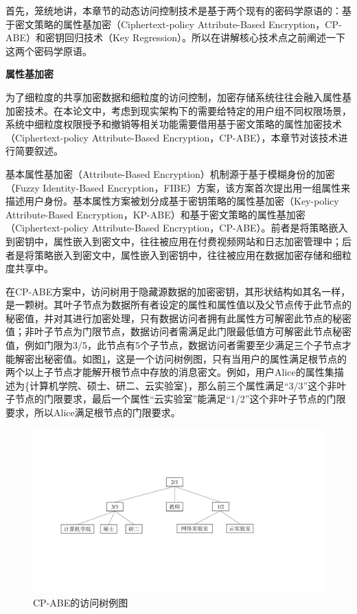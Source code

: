 \documentclass[promaster]{thesis-uestc}
\begin{document}
首先，笼统地讲，本章节的动态访问控制技术是基于两个现有的密码学原语的：基于密文策略的属性基加密（Ciphertext-policy Attribute-Based Encryption，CP-ABE）和密钥回归技术（Key Regression）。所以在讲解核心技术点之前阐述一下这两个密码学原语。

\textbf{属性基加密}\label{属性基加密}

为了细粒度的共享加密数据和细粒度的访问控制，加密存储系统往往会融入属性基加密技术。在本论文中，考虑到现实架构下的需要给特定的用户组不同权限场景，系统中细粒度权限授予和撤销等相关功能需要借用基于密文策略的属性加密技术（Ciphertext-policy Attribute-Based Encryption，CP-ABE），本章节对该技术进行简要叙述。

基本属性基加密（Attribute-Based Encryption）机制源于基于模糊身份的加密（Fuzzy Identity-Based Encryption，FIBE）方案，该方案首次提出用一组属性来描述用户身份。基本属性方案被划分成基于密钥策略的属性基加密（Key-policy Attribute-Based Encryption，KP-ABE）和基于密文策略的属性基加密（Ciphertext-policy Attribute-Based Encryption，CP-ABE）。前者是将策略嵌入到密钥中，属性嵌入到密文中，往往被应用在付费视频网站和日志加密管理中；后者是将策略嵌入到密文中，属性嵌入到密钥中，往往被应用在数据加密存储和细粒度共享中。

在CP-ABE方案中，访问树用于隐藏源数据的加密密钥，其形状结构如其名一样，是一颗树。其叶子节点为数据所有者设定的属性和属性值以及父节点传于此节点的秘密值，并对其进行加密处理，只有数据访问者拥有此属性方可解密此节点的秘密值；非叶子节点为门限节点，数据访问者需满足此门限最低值方可解密此节点秘密值，例如门限为3/5，此节点有5个子节点，数据访问者需要至少满足三个子节点才能解密出秘密值。如图\ref{CP-ABE的访问树例图}，这是一个访问树例图，只有当用户的属性满足根节点的两个以上子节点才能解开根节点中存放的消息密文。例如，用户Alice的属性集描述为\{计算机学院、硕士、研二、云实验室\}，那么前三个属性满足“3/3”这个非叶子节点的门限要求，最后一个属性“云实验室”能满足“1/2”这个非叶子节点的门限要求，所以Alice满足根节点的门限要求。

\begin{figure}[htbp]
    \centering
    \includegraphics[width = 0.9\linewidth]{pic/基于密文策略的属性基加密例图.pdf}
    \caption{CP-ABE的访问树例图}
    \label{CP-ABE的访问树例图}
\end{figure}
\end{document}
